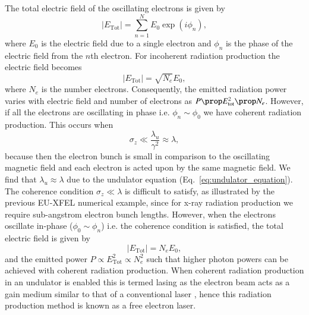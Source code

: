 \documentclass[../main.tex]{subfiles}
\begin{document}
The total electric field of the oscillating electrons is given by
\begin{equation}
\lvert E_{\mathrm{Tot}}\rvert = \sum_{n=1}^{N}E_{0}\exp\left(i\phi_{n}\right),
\label{eq:undulator_bunch_electric_field}    
\end{equation}
where $E_{0}$ is the electric field due to a single electron and $\phi_{n}$ is the phase of the electric field from the $n$th electron. For incoherent radiation production the electric field becomes \cite{wolski2012fel} %
\begin{equation}
\lvert E_{\mathrm{Tot}}\rvert = \sqrt{N_{e}}E_{0},
\label{eq:incoherent_electric_field}
\end{equation}
where $N_{e}$ is the number electrons. Consequently, the emitted radiation power varies with electric field and number of electrons as $P \prop E_{\mathrm{tot}}^{2} \prop N_{e}$. However, if all the electrons are oscillating in phase i.e. $\phi_{n}\sim \phi_{0}$ we have coherent radiation production. This occurs when
\begin{equation}
\sigma_{z} \ll \frac{\lambda_{u}}{\gamma^{2}} \approx \lambda,
\label{eq:coherence_condition}
\end{equation}
because then the electron bunch is small in comparison to the oscillating magnetic field and each electron is acted upon by the same magnetic field. We find that $\lambda_{u} \approx \lambda$ due to the undulator equation (Eq.~\ref{eq:undulator_equation}). The coherence condition $\sigma_{z} \ll \lambda$ is difficult to satisfy, as illustrated by the previous EU-XFEL numerical example, since for x-ray radiation production we require sub-angstrom electron bunch lengths. However, when the electrons oscillate in-phase ($\phi_{0}\sim \phi_{n}$) i.e. the coherence condition is satisfied, the total electric field is given by
\begin{equation}
\lvert E_{\mathrm{Tot}}\rvert = N_{e}E_{0},
\label{eq:coherent_electric_field}    
\end{equation}
and the emitted power $P \propto E_{\mathrm{Tot}}^{2} \propto N_{e}^{2}$ \cite{pellegrini2016physics} such that higher photon powers can be achieved with coherent radiation production. When coherent radiation production in an undulator is enabled this is termed lasing as the electron beam acts as a gain medium similar to that of a conventional laser \cite{brau1988free}, hence this radiation production method is known as a free electron laser. 
\end{document}
